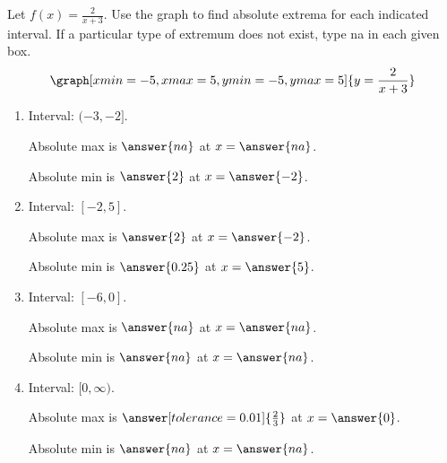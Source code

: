 \documentclass{ximera}
\begin{document}
\begin{problem}\label{prob:240quiz13prob2}
Let $f(x)=\frac{2}{x+3}$.  Use the graph to find absolute extrema for each indicated interval.  If a particular type of extremum does not exist, type na in each given box.
\[
\graph[xmin=-5,xmax=5,ymin=-5,ymax=5]{y=\frac{2}{x+3}} 
\]

\begin{enumerate}
    \item Interval: $(-3, -2]$.
    
    Absolute max is $\answer{na}$ at $x=\answer{na}$.
    
    Absolute min is $\answer{2}$ at $x=\answer{-2}$.
    
    \item Interval: $[-2, 5]$.
    
    Absolute max is $\answer{2}$ at $x=\answer{-2}$.
    
    Absolute min is $\answer{0.25}$ at $x=\answer{5}$.
    
    \item Interval: $[-6, 0]$.
    
    Absolute max is $\answer{na}$ at $x=\answer{na}$.
    
    Absolute min is $\answer{na}$ at $x=\answer{na}$.
    
    \item Interval: $[0, \infty)$.
    
    Absolute max is $\answer[tolerance=0.01]{\frac{2}{3}}$ at $x=\answer{0}$.
    
    Absolute min is $\answer{na}$ at $x=\answer{na}$.
\end{enumerate}
\end{problem}
\end{document}
